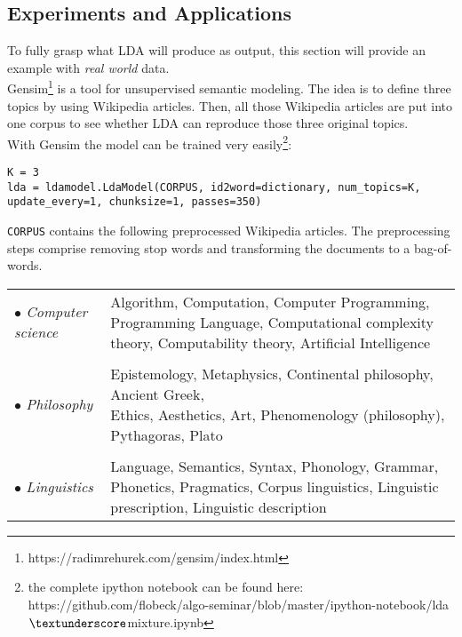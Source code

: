 \documentclass[a4paper,ngerman, english]{atseminar}
\begin{document}
\subsection{Experiments and Applications}
To fully grasp what LDA will produce as output, this section will provide an example with 
\textit{real world} data. \\
Gensim\footnote{ https://radimrehurek.com/gensim/index.html } is a tool for unsupervised semantic modeling.
The idea is to define three topics by using Wikipedia articles. Then, all those Wikipedia articles are
put into one corpus to see whether LDA can reproduce those three original topics.
\\
With Gensim the model can be trained very easily\footnote{the complete ipython notebook can be found here: https://github.com/flobeck/algo-seminar/blob/master/ipython-notebook/lda$\textunderscore$mixture.ipynb}: \\
\begin{lstlisting}[label=noam,caption=\; Query for a document]
K = 3
lda = ldamodel.LdaModel(CORPUS, id2word=dictionary, num_topics=K, 
update_every=1, chunksize=1, passes=350)
\end{lstlisting}

\texttt{CORPUS} contains the following preprocessed Wikipedia articles. The preprocessing steps comprise removing stop words and
transforming the documents to a bag-of-words.
\vspace{1.3cm}

\begin{tabular}{l l}
$\bullet$ \textit{Computer science} & \parbox[t]{10cm}{Algorithm, Computation, Computer Programming,  Programming Language, Computational complexity theory, Computability theory, Artificial Intelligence}\\  
\\
$\bullet$ \textit{Philosophy} & \parbox[t]{10cm}{Epistemology, Metaphysics, Continental philosophy, Ancient Greek,\\ Ethics, Aesthetics, Art, Phenomenology (philosophy), Pythagoras, Plato} \\
\\
$\bullet$ \textit{Linguistics} &  \parbox[t]{10cm}{Language, Semantics, Syntax, Phonology, Grammar,
               Phonetics, Pragmatics,  Corpus linguistics, Linguistic prescription, Linguistic description}
\end{tabular}

\vspace{1.3cm}
\end{document}
